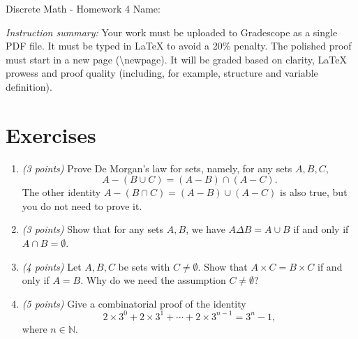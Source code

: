 \documentclass[12pt]{article}
\begin{document}
\begin{center}
    {\LARGE Discrete Math - Homework 4} \Large \newline
    Name:
\end{center}

\vspace{1em}

\noindent \emph{Instruction summary:} Your work must be uploaded to Gradescope as a single PDF file. It must be typed in LaTeX to avoid a 20\% penalty. The polished proof must start in a new page (\textbackslash{newpage}). It will be graded based on clarity, LaTeX prowess and proof quality (including, for example, structure and variable definition).

\section*{Exercises}

\begin{enumerate}[itemsep=1.2em]

\item \emph{(3 points)} Prove De Morgan's law for sets, namely, for any sets \( A, B, C \),
\[
A - (B \cup C) = (A - B) \cap (A - C).
\]
The other identity \( A - (B \cap C) = (A - B) \cup (A - C) \) is also true, but you do not need to prove it. \newline

\item \emph{(3 points)} Show that for any sets \( A, B \), we have \( A \Delta B = A \cup B \) if and only if \( A \cap B = \emptyset \). \newline


\item \emph{(4 points)} Let \( A, B, C \) be sets with \( C \neq \emptyset \). Show that \( A \times C = B \times C \) if and only if \( A = B \). Why do we need the assumption \( C \neq \emptyset \)? \newline

\item \emph{(5 points)} Give a combinatorial proof of the identity
\[
2 \times 3^0 + 2 \times 3^1 + \cdots + 2 \times 3^{n-1} = 3^n - 1,
\]
where \( n \in \mathbb{N} \). \newline

\end{enumerate}
\newpage %
\end{document}
